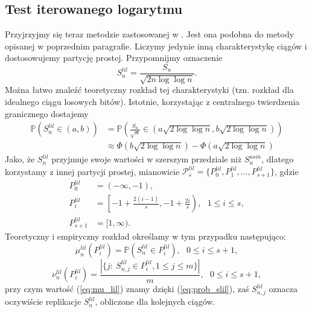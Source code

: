 \documentclass[a4paper,11pt,twoside]{book}
\newcommand{\Pro}[1]{\mathbb{P}\left(#1\right)}
\newcommand{\Slil}[1]{S^{lil}_#1}
\newcommand{\Sasin}[1]{S^{asin}_#1}
\theoremstyle{definition}
\begin{document}
\subsection{Test iterowanego logarytmu}
Przyjrzyjmy się teraz metodzie zastosowanej w \cite{wang-nic}. Jest ona podobna do metody opisanej w poprzednim paragrafie. Liczymy jedynie inną charakterystykę ciągów i dostosowujemy partycję prostej. Przypomnijmy oznaczenie
\begin{equation}
\Slil{n} = \frac{S_n}{\sqrt{2n \log \log n}}.
\end{equation}
Można łatwo znaleźć teoretyczny rozkład tej charakterystyki (tzn. rozkład dla idealnego ciągu losowych bitów). Istotnie, korzystając z centralnego twierdzenia granicznego dostajemy
\begin{equation}
\begin{split}
  \label{eq:prob_slil}
 \Pro{\Slil{n} \in (a,b)} &= \Pro{\frac{S_n}{\sqrt{n}} \in \left(a\sqrt{2 \log \log n},  b\sqrt{2 \log \log n}\right)}\\
 &\approx \Phi(b\sqrt{2 \log \log n}) - \Phi(a\sqrt{2 \log \log n})
\end{split}
\end{equation}
Jako, że $\Slil{n}$ przyjmuje swoje wartości w szerszym przedziale niż $\Sasin{n}$, dlatego korzystamy z innej partycji prostej, mianowicie $\mathcal{P}^{lil}_s = \{ P^{lil}_0, P^{lil}_1, \ldots, P^{lil}_{s+1}\}$, gdzie
\begin{equation*}
\begin{split}
  P^{lil}_0 &= (-\infty, -1),\\
  P^{lil}_i &= \left[-1 + \frac{2(i-1)}{s}, -1 + \frac{2i}{s} \right),\ \ \ 1 \leq i \leq s,\\
  P^{lil}_{s+1} &= [1, \infty).
\end{split}
\end{equation*}
Teoretyczny i empiryczny rozkład określamy w tym przypadku następująco:
\begin{equation}
 \label{eq:mu_lil}
 \mu^{lil}_n \left( P^{lil}_i \right) = \Pro{\Slil{n} \in P^{lil}_i},\ \ \ 0 \leq i \leq s+1,
\end{equation}
\begin{equation}
 \label{eq:emp_lil}
 \nu^{lil}_n \left( P^{lil}_i \right) = \frac{|\{ j:\ \Slil{{n,j}} \in  P^{lil}_i, 1 \leq j \leq m\}|}{m},\ \ \ 0 \leq i \leq s+1,
\end{equation}
przy czym wartość (\ref{eq:mu_lil}) znamy dzięki (\ref{eq:prob_slil}), zaś $\Slil{{n,j}}$ oznacza oczywiście replikacje $\Slil{n}$, obliczone dla kolejnych ciągów.
\end{document}
